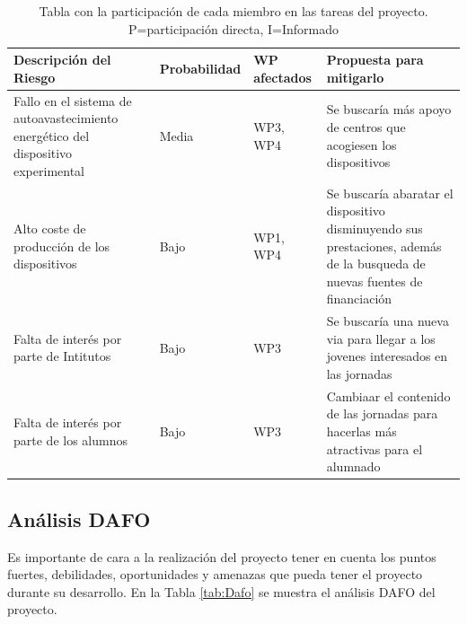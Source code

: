 \documentclass[11pt]{extarticle}
\begin{document}
				\begin{table}[H]
					    \centering
						\begin{tabular}{m{5.0cm} m{2.0cm} m{2.0cm} m{5.0cm}}
							\hline
							\multicolumn{1}{m{5.0cm}}{\centering \textbf{Descripción del Riesgo}} &  
							\multicolumn{1}{m{2.5cm}}{\centering \textbf{Probabilidad}} &
							\multicolumn{1}{m{2.4cm}}{\centering \textbf{WP afectados}} &
							\multicolumn{1}{m{4.cm}}{\centering \textbf{Propuesta para mitigarlo}}  \\ \hline
						   	\hline
						   	Fallo en el sistema de autoavastecimiento energético del dispositivo experimental & Media & WP3, WP4 & Se buscaría más apoyo de centros que acogiesen los dispositivos \\ \hline
						    Alto coste de producción de los dispositivos & Bajo & WP1, WP4 & Se buscaría abaratar el dispositivo disminuyendo sus prestaciones, además de la busqueda de nuevas fuentes de financiación \\ \hline
						    Falta de interés por parte de Intitutos & Bajo & WP3 & Se buscaría una nueva via para llegar a los jovenes interesados en las jornadas \\ \hline
						    Falta de interés por parte de los alumnos & Bajo & WP3 & Cambiaar el contenido de las jornadas para hacerlas más atractivas para el alumnado \\ \hline	    
					    \end{tabular}
					    \caption{\label{tab:Tareas} Tabla con la participación de cada miembro en las tareas del proyecto. P=participación directa, I=Informado}
					\end{table}

			\subsection{Análisis DAFO}
				\label{SubSec:}

					Es importante de cara a la realización del proyecto tener en cuenta los puntos fuertes, debilidades, oportunidades y amenazas que pueda tener el proyecto durante su desarrollo. En la Tabla \ref{tab:Dafo} se muestra el análisis DAFO del proyecto.
\end{document}
